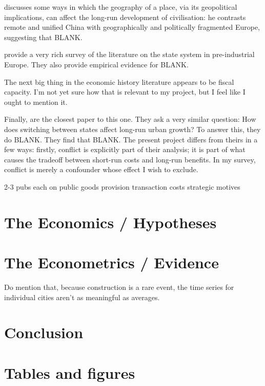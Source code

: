 \documentclass{article}
\begin{document}
\cite{diamond1997} discusses some ways in which the geography of a place, via its geopolitical implications, can affect the long-run development of civilisation: he contrasts remote and unified China with geographically and politically fragmented Europe, suggesting that BLANK.

\cite{cervellati2022} provide a very rich survey of the literature on the state system in pre-industrial Europe. They also provide empirical evidence for BLANK.

The next big thing in the economic history literature appears to be fiscal capacity. I'm not yet sure how that is relevant to my project, but I feel like I ought to mention it.

Finally, \cite{schoenholzer2018} are the closest paper to this one. They ask a very similar question: How does switching between states affect long-run urban growth? To answer this, they do BLANK. They find that BLANK. The present project differs from theirs in a few ways: firstly, conflict is explicitly part of their analysis; it is part of what causes the tradeoff between short-run costs and long-run benefits. In my survey, conflict is merely a confounder whose effect I wish to exclude.


2-3 pubs each on
public goods provision
transaction costs
strategic motives





\section{The Economics / Hypotheses}



\section{The Econometrics / Evidence}

Do mention that, because construction is a rare event, the time series for individual cities aren't as meaningful as averages.


\section{Conclusion}





\newpage
\onehalfspacing



\newpage
\section*{Tables and figures}
\end{document}

